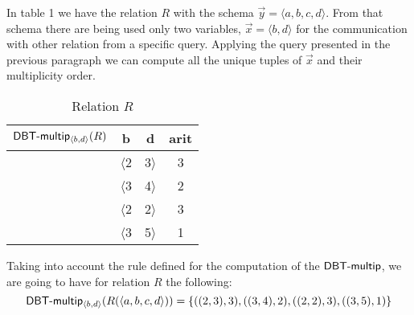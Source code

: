 \documentclass[12pt]{article}
\begin{document}
In table 1 we have the relation $R$ with the schema $\vec y=\langle a,b,c,d\rangle$. From that schema there are being used only two variables, $\vec x=\langle b,d\rangle$ for the communication with other relation from a specific query. Applying the query presented in the previous paragraph we can compute all the unique tuples of $\vec x$ and their multiplicity order.

\begin{table}[H]
\centering
\begin{tabular}{c c c c}
	$\textsf{DBT-multip}{}_{\langle b,d\rangle}(R)$ & b & d & arit \\ [0.2ex]
	\hline
	  & $\langle $2 & 3$\rangle$ & 3\\
	  & $\langle $3 & 4$\rangle$ & 2\\
	  & $\langle $2 & 2$\rangle$ & 3\\
	  & $\langle $3 & 5$\rangle$ & 1\\
\end{tabular}
\caption{Relation $R$}
\end{table}

Taking into account the rule defined for the computation of the $\textsf{DBT-multip}{}$, we are going to have for relation $R$ the following:
$$\textsf{DBT-multip}{}_{\langle b,d\rangle}(R(\langle a,b,c,d\rangle))=\{((2,3),3),((3,4),2),((2,2),3),((3,5),1)\}$$
\end{document}
